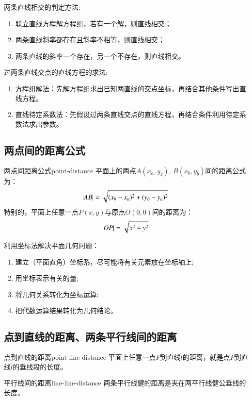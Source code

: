 \begin{note}
   两条直线相交的判定方法:
   \begin{enumerate}
       \item 联立直线方程解方程组，若有一个解，则直线相交；
       \item 两条直线斜率都存在且斜率不相等，则直线相交；
       \item 两条直线的斜率一个存在，另一个不存在，则直线相交。
   \end{enumerate} 
\end{note}

\begin{note}
   过两条直线交点的直线方程的求法:
   \begin{enumerate}
       \item 方程组解法：先解方程组求出已知两直线的交点坐标，再结合其他条件写出直线方程。
       \item 直线待定系数法：先假设过两条直线交点的直线方程，再结合条件利用待定系数法求出参数。
   \end{enumerate} 
\end{note}

\subsection{两点间的距离公式}

\begin{definition}{两点间距离公式}{point-distance}
平面上的两点$A(x_a, y_z)$, $B(x_b, y_b)$间的距离公式为：
\begin{equation}
    \abs{AB} = \sqrt{(x_b - x_a)^2 + (y_b - y_a)^2}
\end{equation}
特别的，平面上任意一点$P(x, y)$与原点$O(0,0)$间的距离为：
\begin{equation}
    \abs{OP} = \sqrt{x^2+y^2}
\end{equation}
\end{definition}

\begin{note}
利用坐标法解决平面几何问题：
\begin{enumerate}
    \item 建立（平面直角）坐标系，尽可能将有关元素放在坐标轴上;
    \item 用坐标表示有关的量;
    \item 将几何关系转化为坐标运算;
    \item 把代数运算结果转化为几何结论。
\end{enumerate}
\end{note}

\subsection{点到直线的距离、两条平行线间的距离}

\begin{definition}{点到直线的距离}{point-line-distance}
平面上任意一点$P$到直线$l$的距离，就是点$P$到直线$l$的垂线段的长度。
\end{definition}

\begin{definition}{平行线间的距离}{line-line-distance}
两条平行线健的距离是夹在两平行线健公垂线的长度。
\end{definition}